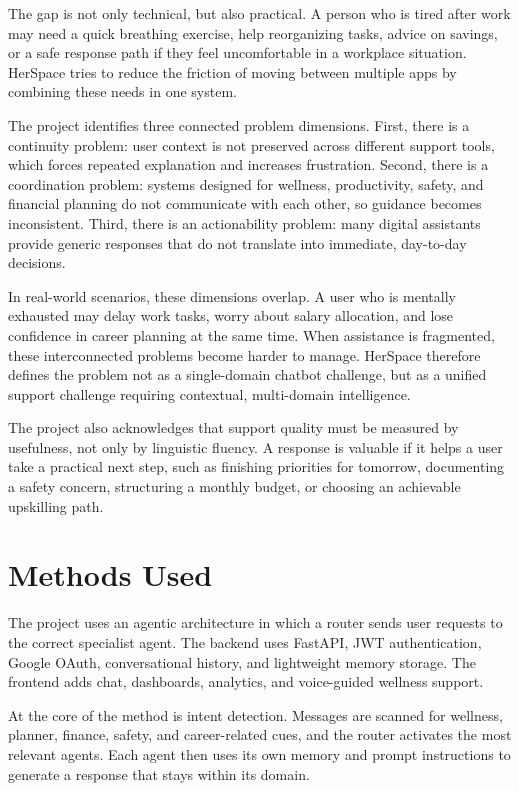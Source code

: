 \documentclass[oneside,a4paper,12pt]{report}
\begin{document}
The gap is not only technical, but also practical. A person who is tired after work may need a quick breathing exercise, help reorganizing tasks, advice on savings, or a safe response path if they feel uncomfortable in a workplace situation. HerSpace tries to reduce the friction of moving between multiple apps by combining these needs in one system.

The project identifies three connected problem dimensions. First, there is a continuity problem: user context is not preserved across different support tools, which forces repeated explanation and increases frustration. Second, there is a coordination problem: systems designed for wellness, productivity, safety, and financial planning do not communicate with each other, so guidance becomes inconsistent. Third, there is an actionability problem: many digital assistants provide generic responses that do not translate into immediate, day-to-day decisions.

In real-world scenarios, these dimensions overlap. A user who is mentally exhausted may delay work tasks, worry about salary allocation, and lose confidence in career planning at the same time. When assistance is fragmented, these interconnected problems become harder to manage. HerSpace therefore defines the problem not as a single-domain chatbot challenge, but as a unified support challenge requiring contextual, multi-domain intelligence.

The project also acknowledges that support quality must be measured by usefulness, not only by linguistic fluency. A response is valuable if it helps a user take a practical next step, such as finishing priorities for tomorrow, documenting a safety concern, structuring a monthly budget, or choosing an achievable upskilling path.

\section{Methods Used}
The project uses an agentic architecture in which a router sends user requests to the correct specialist agent. The backend uses FastAPI, JWT authentication, Google OAuth, conversational history, and lightweight memory storage. The frontend adds chat, dashboards, analytics, and voice-guided wellness support.

At the core of the method is intent detection. Messages are scanned for wellness, planner, finance, safety, and career-related cues, and the router activates the most relevant agents. Each agent then uses its own memory and prompt instructions to generate a response that stays within its domain.
\end{document}
